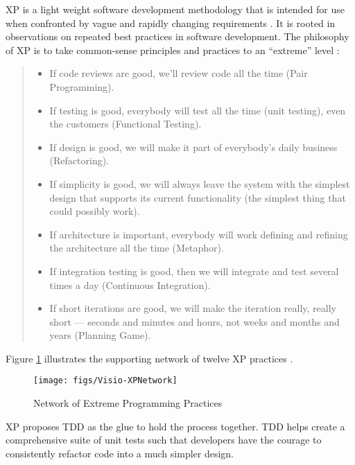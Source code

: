 XP is a light weight software development methodology that is intended
for use when confronted by vague and rapidly changing requirements 
\cite{Beck:00}. It is rooted in observations on repeated best practices 
in software development. The philosophy of XP is to take common-sense 
principles and practices to an ``extreme'' level \cite{Beck:00,Jeffries:00}:
\begin{quote}
\begin{itemize}

\item If code reviews are good, we'll review code all the time (Pair Programming).

\item If testing is good, everybody will test all the time (unit testing), 
even the customers (Functional Testing).

\item If design is good, we will make it part of everybody's daily 
business (Refactoring).

\item If simplicity is good, we will always leave the system with 
the simplest design that supports its current functionality (the 
simplest thing that could possibly work).

\item If architecture is important, everybody will work defining and 
refining the architecture all the time (Metaphor).

\item If integration testing is good, then we will integrate and test 
several times a day (Continuous Integration).

\item If short iterations are good, we will make the iteration really, 
really short --- seconds and minutes and hours, not weeks and months and 
years (Planning Game).

\end{itemize}
\end{quote}

Figure \ref{fig:XPNetwork} illustrates the supporting network of twelve 
XP practices \cite{Beck:00}. 
\begin{figure}[htbp]
  \centering
  \texttt{[image: figs/Visio-XPNetwork]}
  \caption{Network of Extreme Programming Practices\cite{Beck:00}}
  \label{fig:XPNetwork}
\end{figure}
XP proposes TDD as the glue to hold the process together. TDD helps 
create a comprehensive suite of unit tests such that developers have 
the courage to consistently refactor code into a much simpler design.  

